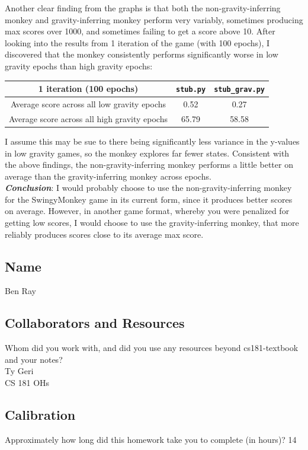 \documentclass[submit]{harvardml}
\begin{document}
Another clear finding from the graphs is that both the non-gravity-inferring monkey and gravity-inferring monkey perform very variably, sometimes producing max scores over 1000, and sometimes failing to get a score above 10. After looking into the results from 1 iteration of the game (with 100 epochs), I discovered that the monkey consistently performs significantly worse in low gravity epochs than high gravity epochs:
\begin{center}
    \begin{tabular}{ |c|c|c| } 
        \hline
        1 iteration (100 epochs) & \texttt{stub.py} & \texttt{stub\_grav.py} \\
        \hline
        Average score across all low gravity epochs & 0.52 & 0.27\\
        \hline
        Average score across all high gravity epochs & 65.79 & 58.58\\
        \hline
    \end{tabular}
\end{center}
I assume this may be sue to there being significantly less variance in the y-values in low gravity games, so the monkey explores far fewer states. Consistent with the above findings, the non-gravity-inferring monkey performs a little better on average than the gravity-inferring monkey across epochs.\\

\textit{\textbf{Conclusion}}:
I would probably choose to use the non-gravity-inferring monkey for the SwingyMonkey game in its current form, since it produces better scores on average. However, in another game format, whereby you were penalized for getting low scores, I would choose to use the gravity-inferring monkey, that more reliably produces scores close to its average max score.

\newpage
\newpage
\newpage
\subsection*{Name}
Ben Ray

\subsection*{Collaborators and Resources}
Whom did you work with, and did you use any resources beyond cs181-textbook and your notes?\\
Ty Geri\\
CS 181 OHs\\

\subsection*{Calibration}
Approximately how long did this homework take you to complete (in hours)?
14
\end{document}
